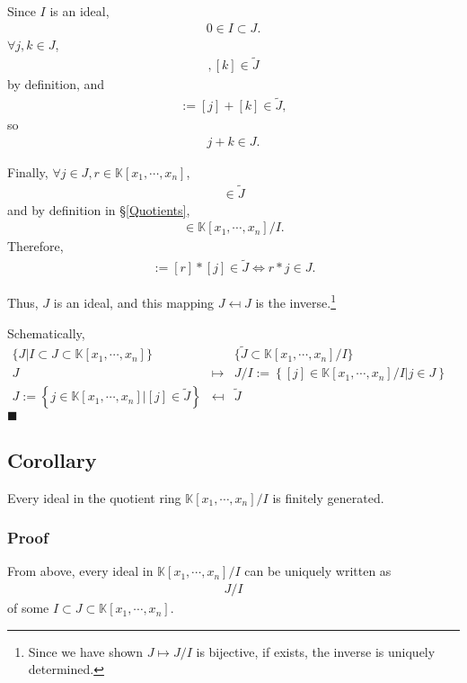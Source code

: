 \documentclass[11pt]{book}
\begin{document}
Since $I$ is an ideal,
\begin{eqnarray}
0 \in I \subset J.
\end{eqnarray}
$\forall j,k \in J$,
\begin{eqnarray}
[j], [k] \in \tilde{J}
\end{eqnarray}
by definition, and
\begin{eqnarray}
[j+k] := [j] + [k] \in \tilde{J},
\end{eqnarray}
so
\begin{eqnarray}
j+k \in J.
\end{eqnarray}

Finally, $\forall j \in J, r \in \mathbb{K}[x_1, \cdots, x_n]$,
\begin{eqnarray}
[j] \in \tilde{J}
\end{eqnarray}
and by definition in \S\ref{Quotients},
\begin{eqnarray}
[r] \in \mathbb{K}[x_1, \cdots, x_n]/I.
\end{eqnarray}
Therefore,
\begin{eqnarray}
[r*j] := [r] * [j] \in \tilde{J} \Leftrightarrow r*j \in J.
\end{eqnarray}

Thus, $J$ is an ideal, and this mapping $J \mapsfrom J$ is the inverse.\footnote{Since we have shown $J \mapsto J/I$ is bijective, if exists, the inverse is uniquely determined.}

Schematically, 
\begin{eqnarray}
\{J | I \subset J \subset \mathbb{K}[x_1, \cdots, x_n] \} && \{\tilde{J} \subset \mathbb{K}[x_1, \cdots, x_n]/ I\} \\
J &\mapsto& J/I := \left\{ \left. [j] \in \mathbb{K}[x_1, \cdots, x_n] / I \right| j \in J \right\} \qquad\qquad\\
J := \left\{ \left. j \in \mathbb{K}[x_1, \cdots, x_n] \right| [j] \in \tilde{J} \right\} &\mapsfrom& \tilde{J}
\end{eqnarray}
$\blacksquare$

\subsection{Corollary}
Every ideal in the quotient ring $\mathbb{K}[x_1, \cdots, x_n] / I$ is finitely generated.

\subsubsection{Proof}
From above, every ideal in $\mathbb{K}[x_1, \cdots, x_n] / I$ can be uniquely written as
\begin{eqnarray}
J/I
\end{eqnarray}
of some $I \subset J \subset \mathbb{K}[x_1, \cdots, x_n]$.
\end{document}
